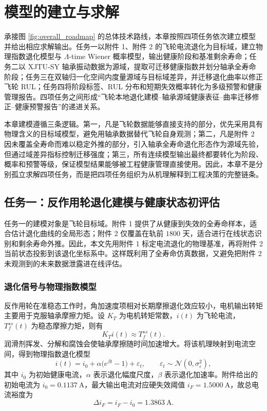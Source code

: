 \section{模型的建立与求解}

承接图 \ref{fig:overall_roadmap} 的总体技术路线，本章按照四项任务依次建立模型并给出相应求解输出。任务一以附件 1、附件 2 的飞轮电流退化为目标域，建立物理指数退化模型与 $\Lambda$-time Wiener 概率模型，输出健康阶段和基准剩余寿命；任务二以 XJTU-SY 轴承振动数据为源域，提取可迁移健康指数并划分轴承全寿命阶段；任务三在双轴归一化空间内度量源域与目标域差异，并迁移退化曲率以修正飞轮 RUL；任务四将阶段标签、RUL 分布和短期失效概率转化为多级预警和健康管理报告。四项任务之间形成“飞轮本地退化建模--轴承源域健康表征--曲率迁移修正--健康预警报告”的递进关系。

本章建模遵循三条逻辑。第一，凡是飞轮数据能够直接支持的部分，优先采用具有物理含义的目标域模型，避免用轴承数据替代飞轮自身观测；第二，凡是附件 2 因未覆盖全寿命而难以稳定外推的部分，引入轴承全寿命退化形态作为源域先验，但通过域差异指标控制迁移强度；第三，所有连续模型输出最终都要转化为阶段、概率和预警等级，保证模型结果能够被工程健康管理直接使用。因此，本章不是分别孤立求解四项任务，而是把四项任务组织为从机理解释到工程决策的完整链条。

\subsection{任务一：反作用轮退化建模与健康状态初评估}

任务一的建模对象是飞轮目标域。附件 1 提供了从健康到失效的全寿命样本，适合估计退化曲线的全局形态；附件 2 仅覆盖在轨前 $1800$ 天，适合进行在线状态识别和剩余寿命外推。因此，本文先用附件 1 标定电流退化的物理基准，再将附件 2 当前状态投影到该退化坐标系中。这样既利用了全寿命仿真数据，又避免把附件 2 未观测到的未来数据泄露进在线评估。

\subsubsection{退化信号与物理指数模型}

反作用轮在准稳态工作时，角加速度项相对长期摩擦退化效应较小，电机输出转矩主要用于克服轴承摩擦力矩。设 $K_T$ 为电机转矩常数，$i(t)$ 为飞轮电流，$T_f^{ss}(t)$ 为稳态摩擦力矩，则有
\begin{equation}
  K_T i(t)\approx T_f^{ss}(t).
\end{equation}
润滑剂挥发、分解和腐蚀会使轴承摩擦随时间加速增大。将该机理映射到电流空间，得到物理指数退化模型
\begin{equation}
  \label{eq:q1_exp_model}
  i(t)=i_0+\alpha\bigl(e^{\beta t}-1\bigr)+\varepsilon_t,
  \qquad
  \varepsilon_t\sim\mathcal N(0,\sigma_\varepsilon^2),
\end{equation}
其中 $i_0$ 为初始健康电流，$\alpha$ 表示退化幅度尺度，$\beta$ 表示退化加速率。附件给出的初始电流为 $i_0=0.1137\ \mathrm A$，最大输出电流对应硬失效阈值 $i_F=1.5000\ \mathrm A$，故总电流裕度为
\begin{equation}
  \Delta i_F=i_F-i_0=1.3863\ \mathrm A.
\end{equation}

